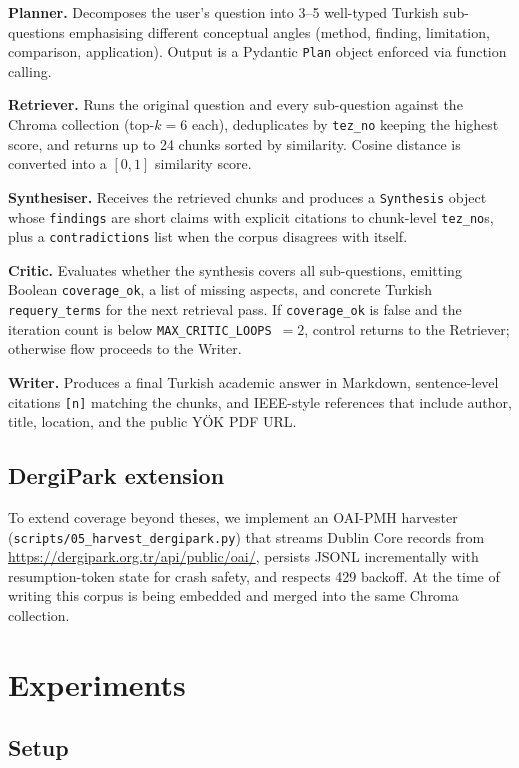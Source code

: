 \documentclass[conference]{IEEEtran}
\begin{document}
\textbf{Planner.} Decomposes the user's question into 3--5 well-typed
Turkish sub-questions emphasising different conceptual angles (method,
finding, limitation, comparison, application). Output is a Pydantic
\texttt{Plan} object enforced via function calling.

\textbf{Retriever.} Runs the original question and every sub-question
against the Chroma collection (top-$k{=}6$ each), deduplicates by
\texttt{tez\_no} keeping the highest score, and returns up to 24 chunks
sorted by similarity. Cosine distance is converted into a
$[0,1]$ similarity score.

\textbf{Synthesiser.} Receives the retrieved chunks and produces a
\texttt{Synthesis} object whose \texttt{findings} are short claims with
explicit citations to chunk-level \texttt{tez\_no}s, plus a
\texttt{contradictions} list when the corpus disagrees with itself.

\textbf{Critic.} Evaluates whether the synthesis covers all sub-questions,
emitting Boolean \texttt{coverage\_ok}, a list of missing aspects, and
concrete Turkish \texttt{requery\_terms} for the next retrieval pass. If
\texttt{coverage\_ok} is false and the iteration count is below
\texttt{MAX\_CRITIC\_LOOPS}~$=2$, control returns to the Retriever; otherwise
flow proceeds to the Writer.

\textbf{Writer.} Produces a final Turkish academic answer in Markdown,
sentence-level citations \texttt{[n]} matching the chunks, and IEEE-style
references that include author, title, location, and the public YÖK PDF
URL.

\subsection{DergiPark extension}

To extend coverage beyond theses, we implement an OAI-PMH harvester
(\texttt{scripts/05\_harvest\_dergipark.py}) that streams Dublin Core records
from
\url{https://dergipark.org.tr/api/public/oai/}, persists JSONL incrementally
with resumption-token state for crash safety, and respects 429 backoff. At
the time of writing this corpus is being embedded and merged into the same
Chroma collection.

\section{Experiments}

\subsection{Setup}
\end{document}
